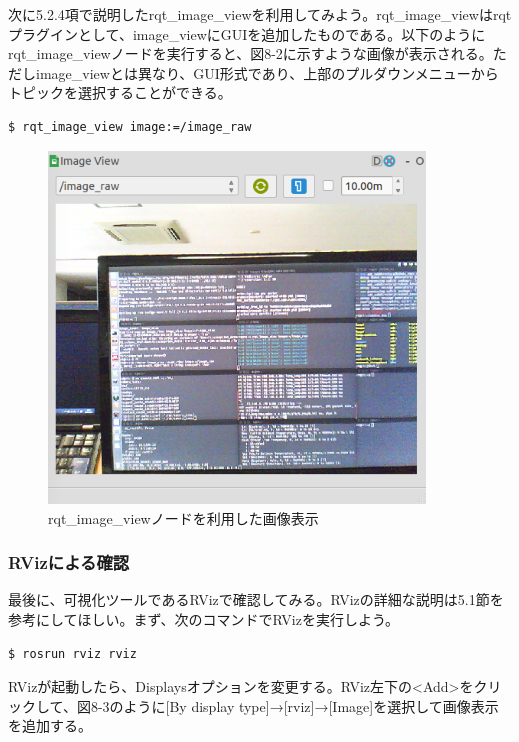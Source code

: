 次に5.2.4項で説明したrqt\_image\_viewを利用してみよう。rqt\_image\_viewはrqtプラグインとして、image\_viewにGUIを追加したものである。以下のようにrqt\_image\_viewノードを実行すると、図8-2に示すような画像が表示される。ただしimage\_viewとは異なり、GUI形式であり、上部のプルダウンメニューからトピックを選択することができる。

\begin{lstlisting}[language=ROS]
$ rqt_image_view image:=/image_raw
\end{lstlisting}

\begin{figure}[htp]
  \centering
  \includegraphics[width=10cm]{pictures/chapter8/pic_08_02.png}
  \caption{rqt\_image\_viewノードを利用した画像表示}
\end{figure}

\subsubsection{RVizによる確認}

最後に、可視化ツールであるRVizで確認してみる。RVizの詳細な説明は5.1節を参考にしてほしい。まず、次のコマンドでRVizを実行しよう。

\begin{lstlisting}[language=ROS]
$ rosrun rviz rviz
\end{lstlisting}

RVizが起動したら、Displaysオプションを変更する。RViz左下の<Add>をクリックして、図8-3のように[By display type]→[rviz]→[Image]を選択して画像表示を追加する。

